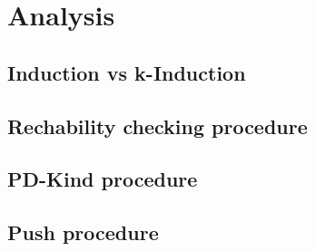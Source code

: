 \chapter{Analysis}

\section{Induction vs k-Induction}

\section{Rechability checking procedure}

\section{PD-Kind procedure}

\section{Push procedure}
